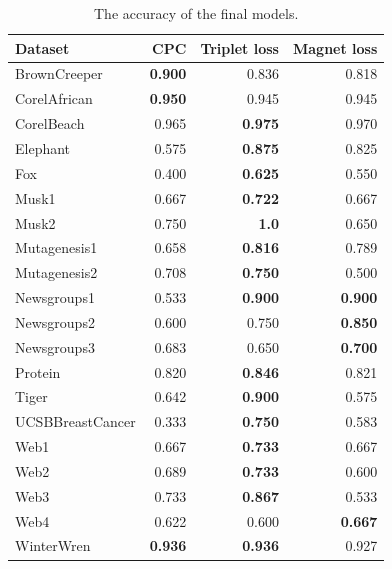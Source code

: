 \begin{table}[h!]
  \centering
  \begin{tabular}{lrrr}
    \toprule
    Dataset          & CPC            & Triplet loss   & Magnet loss \\
    \midrule
    BrownCreeper     & \textbf{0.900} & 0.836          & 0.818 \\
    CorelAfrican     & \textbf{0.950} & 0.945          & 0.945 \\
    CorelBeach       & 0.965          & \textbf{0.975} & 0.970 \\
    Elephant         & 0.575          & \textbf{0.875} & 0.825 \\
    Fox              & 0.400          & \textbf{0.625} & 0.550 \\
    Musk1            & 0.667          & \textbf{0.722} & 0.667 \\
    Musk2            & 0.750          & \textbf{1.0}   & 0.650 \\
    Mutagenesis1     & 0.658          & \textbf{0.816} & 0.789 \\
    Mutagenesis2     & 0.708          & \textbf{0.750} & 0.500 \\
    Newsgroups1      & 0.533          & \textbf{0.900} & \textbf{0.900} \\
    Newsgroups2      & 0.600          & 0.750          & \textbf{0.850} \\
    Newsgroups3      & 0.683          & 0.650          & \textbf{0.700} \\
    Protein          & 0.820          & \textbf{0.846} & 0.821 \\
    Tiger            & 0.642          & \textbf{0.900} & 0.575 \\
    UCSBBreastCancer & 0.333          & \textbf{0.750} & 0.583 \\
    Web1             & 0.667          & \textbf{0.733} & 0.667 \\
    Web2             & 0.689          & \textbf{0.733} & 0.600 \\
    Web3             & 0.733          & \textbf{0.867} & 0.533 \\
    Web4             & 0.622          & 0.600          & \textbf{0.667} \\
    WinterWren       & \textbf{0.936} & \textbf{0.936} & 0.927 \\
    \bottomrule
  \end{tabular}
  \caption{The accuracy of the final models.}\label{tab:toy-accuracy}
\end{table}

